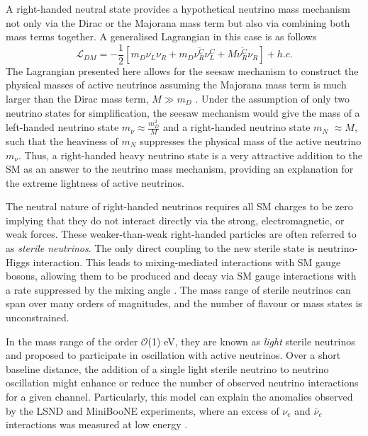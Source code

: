 A right-handed neutral state provides a hypothetical neutrino mass mechanism not only via the Dirac or the Majorana mass term but also via combining both mass terms together.
A generalised Lagrangian in this case is as follows \cite{Thomson}
\begin{equation}
	\mathcal{L}_{DM} = -\frac{1}{2}[m_D\overline{\nu_{L}}\nu_{R} + m_D\overline{\nu_{R}^{C}}\nu_{L}^C + M\overline{\nu_{R}^{C}}\nu_{R}] + h.c.
\end{equation}
The Lagrangian presented here allows for the seesaw mechanism to construct the physical masses of active neutrinos assuming the Majorana mass term is much larger than the Dirac mass term, $M \gg m_D$ \cite{Thomson, nuMass}.
Under the assumption of only two neutrino states for simplification, the seesaw mechanism would give the mass of a left-handed neutrino state $m_{\nu} \approx \frac{m_D^2}{M}$ and a right-handed neutrino state $m_N$ $\approx M$, such that the heaviness of $m_N$ suppresses the physical mass of the active neutrino $m_\nu$.
Thus, a right-handed heavy neutrino state is a very attractive addition to the SM as an answer to the neutrino mass mechanism, providing an explanation for the extreme lightness of active neutrinos.

The neutral nature of right-handed neutrinos requires all SM charges to be zero implying that they do not interact directly via the strong, electromagnetic, or weak forces.
These weaker-than-weak right-handed particles are often referred to as \textit{sterile neutrinos}.
The only direct coupling to the new sterile state is neutrino-Higgs interaction.
This leads to mixing-mediated interactions with SM gauge bosons, allowing them to be produced and decay via SM gauge interactions with a rate suppressed by the mixing angle \cite{SBNHNL}.
The mass range of sterile neutrinos can span over many orders of magnitudes, and the number of flavour or mass states is unconstrained.

In the mass range of the order $\mathcal{O}$(1) eV, they are known as \textit{light} sterile neutrinos and proposed to participate in oscillation with active neutrinos.
Over a short baseline distance, the addition of a single light sterile neutrino to neutrino oscillation might enhance or reduce the number of observed neutrino interactions for a given channel. 
Particularly, this model can explain the anomalies observed by the LSND and MiniBooNE experiments, where an excess of $\nu_e$ and $\overline{\nu}_e$ interactions was measured at low energy \cite{HNLWhitePaper}. 

